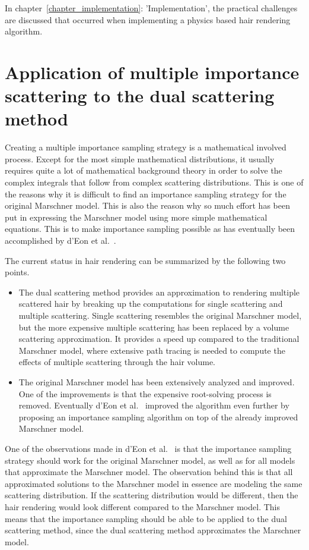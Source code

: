 \documentclass[11pt,a4paper]{report}
\begin{document}
In chapter~\ref{chapter_implementation}: 'Implementation', the practical challenges are discussed that occurred when implementing a physics based hair rendering algorithm.



\section{Application of multiple importance scattering to the dual scattering method}
\label{approach_problem1}

Creating a multiple importance sampling strategy is a mathematical involved process. Except for the most simple mathematical distributions, it usually requires quite a lot of mathematical background theory in order to solve the complex integrals that follow from complex scattering distributions. This is one of the reasons why it is difficult to find an importance sampling strategy for the original Marschner model. This is also the reason why so much effort has been put in expressing the Marschner model using more simple mathematical equations. This is to make importance sampling possible as has eventually been accomplished by d'Eon et al.~\cite{eon2013}.

The current status in hair rendering can be summarized by the following two points.

\begin{itemize}
    \item The dual scattering method provides an approximation to rendering multiple scattered hair by breaking up the computations for single scattering and multiple scattering. Single scattering resembles the original Marschner model, but the more expensive multiple scattering has been replaced by a volume scattering approximation. It provides a speed up compared to the traditional Marschner model, where extensive path tracing is needed to compute the effects of multiple scattering through the hair volume.
    \item The original Marschner model has been extensively analyzed and improved. One of the improvements is that the expensive root-solving process is removed. Eventually d'Eon et al.~\cite{eon2013} improved the algorithm even further by proposing an importance sampling algorithm on top of the already improved Marschner model.
\end{itemize}

One of the observations made in d'Eon et al.~\cite{eon2013} is that the importance sampling strategy should work for the original Marschner model, as well as for all models that approximate the Marschner model. The observation behind this is that all approximated solutions to the Marschner model in essence are modeling the same scattering distribution. If the scattering distribution would be different, then the hair rendering would look different compared to the Marschner model. This means that the importance sampling should be able to be applied to the dual scattering method, since the dual scattering method approximates the Marschner model.
\end{document}
